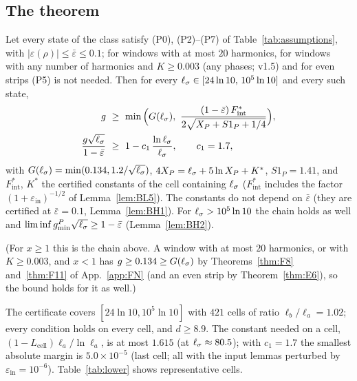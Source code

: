 \subsection{The theorem}
\begin{theorem} 
\label{thm:AY1P}
Let every state of the class satisfy (P0), (P2)--(P7) of Table~\ref{tab:assumptions}, with $|\varepsilon(\rho)|\le\bar\varepsilon\le0.1$; for windows with at most $20$ harmonics, for windows with any number of harmonics and $K\ge0.003$ (any phases; v1.5) and for even strips (P5) is not
needed. Then for every
$\ell_\sigma\in[24\ln10,\,10^5\ln10]$ and every such state,
\begin{equation}
\begin{aligned}
g\ &\ge\ \min\Big(G(\ls),\ \frac{(1-\bar\varepsilon)\,F_{\mathrm{int}}^*}{2\sqrt{X_P+S1_P+1/4}}\Big),\\
\frac{g\sqrt{\ls}}{1-\bar\varepsilon}\ &\ge\ 1-c_1\,\frac{\ln\ls}{\ls},\qquad c_1=1.7,
\end{aligned}
\end{equation}
with $G(\ell_\sigma)=\min(0.134,1.2/\sqrt{\ell_\sigma})$, $4X_P=\ell_\sigma+5\ln X_P+K^*$, $S1_P=1.41$, and $F_{\mathrm{int}}^*$, $K^*$ the certified constants of the cell
containing $\ell_\sigma$ ($F_{\mathrm{int}}^*$ includes the factor $(1+\varepsilon_{\mathrm{in}})^{-1/2}$ of Lemma~\ref{lem:BL5}). The constants do not depend on $\bar\varepsilon$ (they are certified at $\bar\varepsilon=0.1$, Lemma~\ref{lem:BH1}). For $\ell_\sigma>10^5\ln10$ the chain holds as
well and $\liminf g_{\min}^P\sqrt{\ell_\sigma}\ge1-\bar\varepsilon$ (Lemma~\ref{lem:BH2}).
\end{theorem}
(For $x\ge1$ this is the chain above. A window with at most $20$ harmonics, or with $K\ge0.003$, and $x<1$ has $g\ge0.134\ge G(\ell_\sigma)$
by Theorems~\ref{thm:F8} and~\ref{thm:F11} of App.~\ref{app:FN} (and an even strip by Theorem~\ref{thm:E6}), so the bound holds for it as well.)

The certificate covers $[24\ln10,10^5\ln10]$ with $421$ cells of ratio $\ell_b/\ell_a=1.02$; every condition holds on every cell, and $d\ge8.9$.
The constant needed on a cell, $(1-L_{\mathrm{cell}})\ell_a/\ln\ell_a$, is at most $1.615$ (at $\ell_\sigma\approx80.5$); with $c_1=1.7$ the smallest
absolute margin is $5.0\times10^{-5}$ (last cell; all with the input lemmas perturbed by $\varepsilon_{\mathrm{in}}=10^{-6}$). Table~\ref{tab:lower} shows representative cells.

